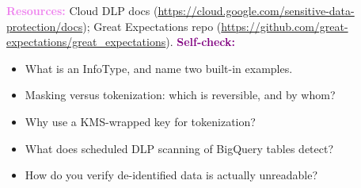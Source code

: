\documentclass[11pt, a4paper]{article}
\newcommand{\resources}[1]{\vspace{1mm}\noindent\textbf{\textcolor{violet}{Resources:}} #1}
\newcommand{\selfcheck}[1]{\vspace{1mm}\noindent\textbf{\textcolor{purple}{Self-check:}} #1}
\begin{document}
\resources{Cloud DLP docs (\url{https://cloud.google.com/sensitive-data-protection/docs}); Great Expectations repo (\url{https://github.com/great-expectations/great_expectations}).}
\selfcheck{\begin{itemize}[label=-, nosep, leftmargin=1.5em]
    \item What is an InfoType, and name two built-in examples.
    \item Masking versus tokenization: which is reversible, and by whom?
    \item Why use a KMS-wrapped key for tokenization?
    \item What does scheduled DLP scanning of BigQuery tables detect?
    \item How do you verify de-identified data is actually unreadable?
\end{itemize}}
\end{document}
